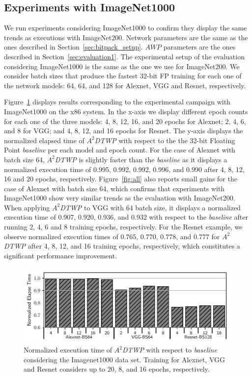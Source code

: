 \subsection{Experiments with ImageNet1000}
\label{sec:ImageNet1000}
We run experiments considering ImageNet1000 to confirm they display the same 
trends as executions with ImageNet200.  Network parameters are the same as the 
ones described in Section~\ref{sec:bitpack_setup}.
$AWP$ parameters are the ones described in Section~\ref{sec:evaluation1}.
The experimental setup of the evaluation considering ImageNet1000 is the same as 
the one we use for ImageNet200.
We consider batch sizes that produce the fastest 32-bit FP training for each one 
of the network models: 64, 64, and 128 for Alexnet, VGG and Resnet, 
respectively.


Figure~\ref{fig:ImageNet1000} displays results corresponding to the experimental 
campaign with ImageNet1000 on the x86 system.
In the x-axis we display different epoch counts for each one of the three 
models: 4, 8, 12, 16, and 20 epochs for Alexnet; 2, 4, 6, and 8 for VGG; and 4, 
8, 12, and 16 epochs for Resnet.
The y-axis displays the normalized elapsed time of \textit{$A^2$DTWP} with 
respect to the the 32-bit Floating Point \textit{baseline} per each model and 
epoch count.
For the case of Alexnet with batch size 64, \textit{$A^2$DTWP} is slightly 
faster than the \textit{baseline} as it displays a normalized execution time of 
0.995, 0.992, 0.992, 0.996, and 0.990 after 4, 8, 12, 16 and 20 epochs, 
respectively.
Figure~\ref{fig:all} also reports small gains for the case of Alexnet with batch 
size 64, which confirms that experiments with ImageNet1000 show very similar 
trends as the evaluation with ImageNet200.
When applying \textit{$A^2$DTWP} to VGG with 64 batch size, it displays a 
normalized execution time of 0.907, 0.920, 0.936, and 0.932 with respect to the 
\textit{baseline} after running 2, 4, 6 and 8 training epochs, respectively.
For the Resnet example, we observe normalized execution times of 0.765, 0.770, 
0.778, and 0.777 for \textit{$A^2$DTWP} after 4, 8, 12, and 16 training epochs, 
respectively,
which constitutes a significant performance improvement.

\begin{figure}%
    \centerline{\includegraphics[scale=0.85]{bitpack/figs/imagenet-1k-3net.pdf}}
    \caption{Normalized execution time of \textit{$A^2$DTWP} with respect to 
    \textit{baseline} considering the Imagenet1000 data set. Training for 
    Alexnet, VGG and Resnet considers up to 20, 8, and 16 epochs, respectively.}
    \label{fig:ImageNet1000}
\end{figure}

